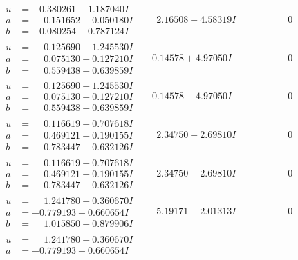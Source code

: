 \documentclass[1p]{elsarticle_modified}
\theoremstyle{definition}
\begin{document}
$$\begin{array}{c|c|c}
\begin{aligned}
u &= -0.380261 - 1.187040 I \\
a &= \phantom{-}0.151652 - 0.050180 I \\
b &= -0.080254 + 0.787124 I\end{aligned}
 & \phantom{-}2.16508 - 4.58319 I & \phantom{-0.000000 } 0 \\ \hline\begin{aligned}
u &= \phantom{-}0.125690 + 1.245530 I \\
a &= \phantom{-}0.075130 + 0.127210 I \\
b &= \phantom{-}0.559438 - 0.639859 I\end{aligned}
 & -0.14578 + 4.97050 I & \phantom{-0.000000 } 0 \\ \hline\begin{aligned}
u &= \phantom{-}0.125690 - 1.245530 I \\
a &= \phantom{-}0.075130 - 0.127210 I \\
b &= \phantom{-}0.559438 + 0.639859 I\end{aligned}
 & -0.14578 - 4.97050 I & \phantom{-0.000000 } 0 \\ \hline\begin{aligned}
u &= \phantom{-}0.116619 + 0.707618 I \\
a &= \phantom{-}0.469121 + 0.190155 I \\
b &= \phantom{-}0.783447 - 0.632126 I\end{aligned}
 & \phantom{-}2.34750 + 2.69810 I & \phantom{-0.000000 } 0 \\ \hline\begin{aligned}
u &= \phantom{-}0.116619 - 0.707618 I \\
a &= \phantom{-}0.469121 - 0.190155 I \\
b &= \phantom{-}0.783447 + 0.632126 I\end{aligned}
 & \phantom{-}2.34750 - 2.69810 I & \phantom{-0.000000 } 0 \\ \hline\begin{aligned}
u &= \phantom{-}1.241780 + 0.360670 I \\
a &= -0.779193 - 0.660654 I \\
b &= \phantom{-}1.015850 + 0.879906 I\end{aligned}
 & \phantom{-}5.19171 + 2.01313 I & \phantom{-0.000000 } 0 \\ \hline\begin{aligned}
u &= \phantom{-}1.241780 - 0.360670 I \\
a &= -0.779193 + 0.660654 I \\

\end{aligned}
\end{array}$$
\end{document}
